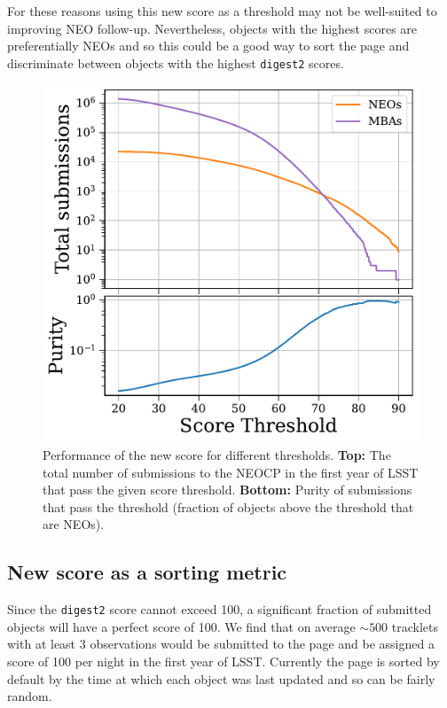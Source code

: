 \documentclass[twocolumn, twocolappendix]{aastex631}
\newcommand{\dig}{\texttt{digest2}}
\begin{document}
For these reasons using this new score as a threshold may not be well-suited to improving NEO follow-up. Nevertheless, objects with the highest scores are preferentially NEOs and so this could be a good way to sort the page and discriminate between objects with the highest \dig{} scores.

\begin{figure}[htb]
    \centering
    \includegraphics[width=\columnwidth]{example_score.pdf}
    \caption{Performance of the new score for different thresholds. \textbf{Top:} The total number of submissions to the NEOCP in the first year of LSST that pass the given score threshold. \textbf{Bottom:} Purity of submissions that pass the threshold (fraction of objects above the threshold that are NEOs).}
    \label{fig:new_score_demo}
\end{figure}

\subsection{New score as a sorting metric}

Since the \dig{} score cannot exceed 100, a significant fraction of submitted objects will have a perfect score of 100. We find that on average ${\sim}500$ tracklets with at least 3 observations would be submitted to the page and be assigned a score of 100 per night in the first year of LSST. Currently the page is sorted by default by the time at which each object was last updated and so can be fairly random.
\end{document}
